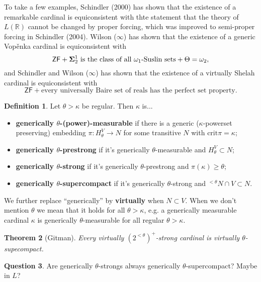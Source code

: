 \documentclass{amsart}
\newtheorem{theorem}{Theorem}[section]
\theoremstyle{definition}
\newtheorem{definition}[theorem]{Definition}
\newtheorem{question}[theorem]{Question}
\newcommand{\crit}{\text{crit}}
\begin{document}
To take a few examples, Schindler (2000) has shown that the existence of a remarkable cardinal is equiconsistent with thte statement that the theory of $L(\mathbb R)$ cannot be changed by proper forcing, which was improved to semi-proper forcing in Schindler (2004). Wilson ($\infty$) has shown that the existence of a generic Vop\v enka cardinal is equiconsistent with
\[
  \textsf{ZF} + \text{${\bf\Sigma}^1_2$ is the class of all $\omega_1$-Suslin sets} + \Theta = \omega_2,
\]
and Schindler and Wilson ($\infty$) has shown that the existence of a virtually Shelah cardinal is equiconsistent with
\[
  \textsf{ZF} + \text{every universally Baire set of reals has the perfect set property}.
\]

\begin{definition}
  Let $\theta>\kappa$ be regular. Then $\kappa$ is...
  \begin{itemize}
    \item \textbf{generically $\theta$-(power)-measurable} if there is a generic ($\kappa$-powerset preserving) embedding $\pi:H_\theta^V\to N$ for some transitive $N$ with $\crit\pi=\kappa$;
    \item \textbf{generically $\theta$-prestrong} if it's generically $\theta$-measurable and $H_\theta^V\subset N$;
    \item \textbf{generically $\theta$-strong} if it's generically $\theta$-prestrong and $\pi(\kappa)\geq\theta$;
    \item \textbf{generically $\theta$-supercompact} if it's generically $\theta$-strong and ${^{<\theta}} N\cap V\subset N$.\\
  \end{itemize}

  We further replace ``generically'' by \textbf{virtually} when $N\subset V$. When we don't mention $\theta$ we mean that it holds for all $\theta>\kappa$, e.g. a generically measurable cardinal $\kappa$ is generically $\theta$-measurable for all regular $\theta>\kappa$.
\end{definition}

\begin{theorem}[Gitman]
  Every virtually $(2^{<\theta})^+$-strong cardinal is virtually $\theta$-supecompact.
\end{theorem}

\begin{question} 
Are generically $\theta$-strongs always generically $\theta$-supercompact? Maybe in $L$? 
\end{question} 
\end{document}

